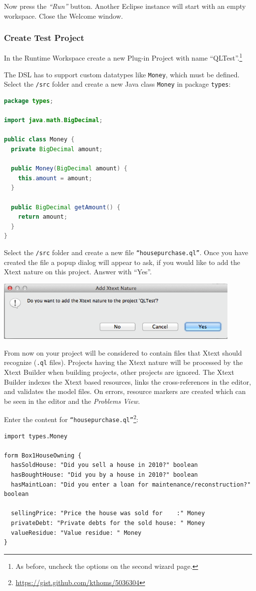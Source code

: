 Now press the \emph{``Run''} button. Another Eclipse instance will start with an
empty workspace. Close the Welcome window.


\subsubsection{Create Test Project}

In the Runtime Workspace create a new Plug-in Project with name
``QLTest''.\footnote{As before, uncheck the options on the second wizard page.}

The DSL has to support custom datatypes like \texttt{Money}, which must be
defined. Select the \texttt{/src} folder and create a new Java class \texttt{Money} in package
\texttt{types}:
\begin{lstlisting}[language=Java]
package types;

import java.math.BigDecimal;

public class Money {
  private BigDecimal amount;

  public Money(BigDecimal amount) {
    this.amount = amount;
  }

  public BigDecimal getAmount() {
    return amount;
  }
}
\end{lstlisting}
 

Select the \texttt{/src} folder and create a new file
\texttt{``housepurchase.ql''}. Once you have created the file a popup dialog
will appear to ask, if you would like to add the Xtext nature on this project.
Answer with ``Yes''.

\includegraphics[width=12cm]{./images/chapter01/AddXtextNature.png}

From now on your project will be considered to contain files that Xtext should
recognize (\texttt{.ql} files). Projects having the Xtext nature will be processed by the
Xtext Builder when building projects, other projects are ignored. The Xtext
Builder indexes the Xtext based resources, links the cross-references in the
editor, and validates the model files. On errors, resource markers are created
which can be seen in the editor and the \emph{Problems View}.

Enter the content for
\texttt{``housepurchase.ql''}\footnote{\url{https://gist.github.com/kthoms/5036304}}:
\begin{lstlisting}[language=QL]
import types.Money

form Box1HouseOwning {
  hasSoldHouse: "Did you sell a house in 2010?" boolean
  hasBoughtHouse: "Did you by a house in 2010?" boolean
  hasMaintLoan: "Did you enter a loan for maintenance/reconstruction?" boolean

  sellingPrice: "Price the house was sold for    :" Money
  privateDebt: "Private debts for the sold house: " Money
  valueResidue: "Value residue: " Money
}
\end{lstlisting}

